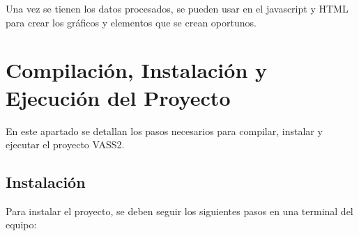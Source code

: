 Una vez se tienen los datos procesados, se pueden usar en el javascript y HTML para crear los gráficos y elementos que se crean oportunos.

\section{Compilación, Instalación y Ejecución del Proyecto}

En este apartado se detallan los pasos necesarios para compilar, instalar y ejecutar el proyecto VASS2.

\subsection{Instalación}

Para instalar el proyecto, se deben seguir los siguientes pasos en una terminal del equipo:


